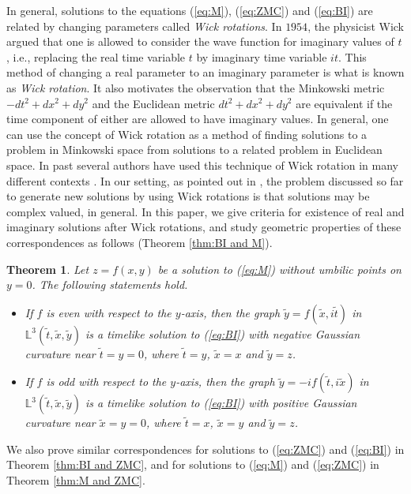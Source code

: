 \documentclass[12pt,amstex]{amsart}%
\theoremstyle{plain} %
\newtheorem{theor}{Theorem}
\theoremstyle{definition}
\begin{document}
 In general, solutions to the equations (\ref{eq:M}), (\ref{eq:ZMC}) and (\ref{eq:BI}) are related  by changing parameters called {\it Wick rotations}. In $ 1954 $, the physicist Wick \cite{GCW} argued that one is allowed to consider the wave function for imaginary values of $ t $, i.e.,  replacing the real time variable $ t $  by imaginary time variable $ it $. This method of changing a real parameter to an imaginary parameter  is what is known as {\it Wick rotation}. It also motivates the observation that the Minkowski metric $ -dt^2+dx^2+dy^2 $ and the Euclidean metric $ dt^2+dx^2+dy^2 $ are equivalent if the time component of either are allowed to have imaginary values. In general, one can use the concept of Wick rotation as a method of finding  solutions to a problem in Minkowski space from solutions to a related problem in Euclidean space.  In past several authors have used this technique of Wick rotation in many different contexts \cite{DS,GI,Kamien,KKSY,MVV}. In our setting, as pointed out in \cite[Section $5$]{MVV}, the problem discussed so far to generate new solutions by using Wick rotations is that solutions may be complex valued, in general. In this paper, we give criteria for existence of real and imaginary solutions after Wick rotations, and study geometric properties of these correspondences as follows (Theorem \ref{thm:BI and M}).
\begin{theor}\label{maintheorem1}
Let $z=f(x,y)$ be a solution to (\ref{eq:M}) without umbilic points on $y=0$. The following statements hold.
\begin{itemize}
\item[(i)] If $f$ is even with respect to the $y$-axis, then the graph $\tilde{y}=f(\tilde{x},i\tilde{t})$ in $\mathbb{L}^3(\tilde{t},\tilde{x},\tilde{y})$ is a timelike solution to (\ref{eq:BI}) with negative Gaussian curvature near $\tilde{t}=y=0$, where $\tilde{t}=y$, $\tilde{x}=x$ and $\tilde{y}=z$.
\item[(ii)]If $f$ is odd with respect to the $y$-axis, then the graph $\tilde{y}=-if(\tilde{t},i\tilde{x})$ in $\mathbb{L}^3(\tilde{t},\tilde{x},\tilde{y})$ is a timelike solution to (\ref{eq:BI}) with positive Gaussian curvature near $\tilde{x}=y=0$, where $\tilde{t}=x$, $\tilde{x}=y$ and $\tilde{y}=z$.
\end{itemize}
\end{theor}
We also prove similar correspondences for solutions to (\ref{eq:ZMC}) and (\ref{eq:BI}) in Theorem \ref{thm:BI and ZMC}, and for solutions to (\ref{eq:M}) and (\ref{eq:ZMC}) in Theorem \ref{thm:M and ZMC}.
\end{document}
